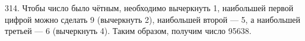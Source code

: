 314. Чтобы число было чётным, необходимо вычеркнуть 1, наибольшей первой цифрой можно сделать 9 (вычеркнуть 2), наибольшей второй --- 5, а наибольшей третьей --- 6 (вычеркнуть 4). Таким образом, получим число 95638.\\
